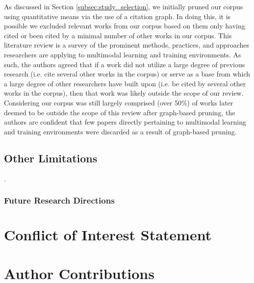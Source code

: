 \documentclass[manuscript,screen,review]{acmart}
\begin{document}
As discussed in Section \ref{subsec:study_selection}, we initially pruned our corpus using quantitative means via the use of a citation graph. In doing this, it is possible we excluded relevant works from our corpus based on them only having cited or been cited by a minimal number of other works in our corpus. This literature review is a survey of the prominent methods, practices, and approaches researchers are applying to multimodal learning and training environments. As such, the authors agreed that if a work did not utilize a large degree of previous research (i.e. cite several other works in the corpus) or serve as a base from which a large degree of other researchers have built upon (i.e. be cited by several other works in the corpus), then that work was likely outside the scope of our review. Considering our corpus was still largely comprised (over 50\%) of works later deemed to be outside the scope of this review after graph-based pruning, the authors are confident that few papers directly pertaining to multimodal learning and training environments were discarded as a result of graph-based pruning.

\subsection{Other Limitations}.



\subsubsection{Future Research Directions} 

\section*{Conflict of Interest Statement}

\section*{Author Contributions}
\end{document}
